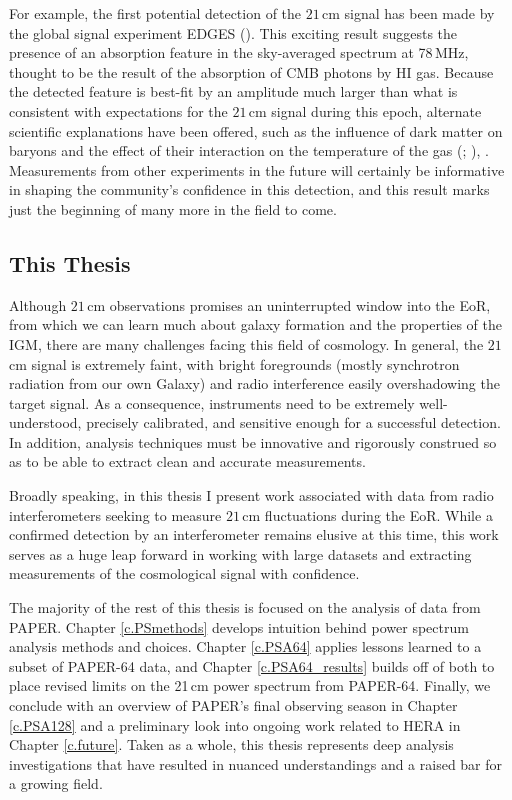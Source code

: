 For example, the first potential detection of the $21$\,cm signal has been made by the global signal experiment EDGES (\citealt{bowman_et_al2018}). This exciting result suggests the presence of an absorption feature in the sky-averaged spectrum at 78\,MHz, thought to be the result of the absorption of CMB photons by HI gas. Because the detected feature is best-fit by an amplitude much larger than what is consistent with expectations for the $21$\,cm signal during this epoch, alternate scientific explanations have been offered, such as the influence of dark matter on baryons and the effect of their interaction on the temperature of the gas (\citealt{barkana2018}; \citealt{slatyer_wu2018}), . Measurements from other experiments in the future will certainly be informative in shaping the community's confidence in this detection, and this result marks just the beginning of many more in the field to come.

\subsection{This Thesis}

Although $21$\,cm observations promises an uninterrupted window into the EoR, from which we can learn much about galaxy formation and the properties of the IGM, there are many challenges facing this field of cosmology. In general, the $21$\,cm signal is extremely faint, with bright foregrounds (mostly synchrotron radiation from our own Galaxy) and radio interference easily overshadowing the target signal. As a consequence, instruments need to be extremely well-understood, precisely calibrated, and sensitive enough for a successful detection. In addition, analysis techniques must be innovative and rigorously construed so as to be able to extract clean and accurate measurements.

Broadly speaking, in this thesis I present work associated with data from radio interferometers seeking to measure $21$\,cm fluctuations during the EoR. While a confirmed detection by an interferometer remains elusive at this time, this work serves as a huge leap forward in working with large datasets and extracting measurements of the cosmological signal with confidence. 

The majority of the rest of this thesis is focused on the analysis of data from PAPER. Chapter \ref{c.PSmethods} develops intuition behind power spectrum analysis methods and choices. Chapter \ref{c.PSA64} applies lessons learned to a subset of PAPER-64 data, and Chapter \ref{c.PSA64_results} builds off of both to place revised limits on the 21\,cm power spectrum from PAPER-64. Finally, we conclude with an overview of PAPER's final observing season in Chapter \ref{c.PSA128} and a preliminary look into ongoing work related to HERA in Chapter \ref{c.future}. Taken as a whole, this thesis represents deep analysis investigations that have resulted in nuanced understandings and a raised bar for a growing field. 


